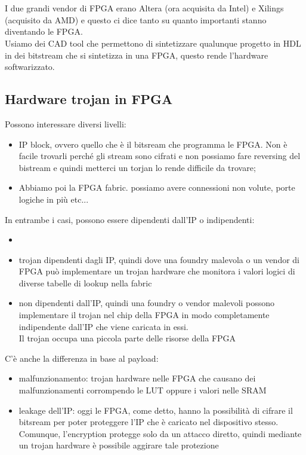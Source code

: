 \documentclass[oneside, 12pt]{extbook}
\begin{document}
\\\\I due grandi vendor di FPGA erano Altera (ora acquisita da Intel) e Xilings (acquisito da AMD) e questo ci dice tanto su quanto importanti stanno diventando le FPGA.
\\Usiamo dei CAD tool che permettono di sintetizzare qualunque progetto in HDL in dei bitstream che si sintetizza in una FPGA, questo rende l'hardware softwarizzato.

\subsection{Hardware trojan in FPGA}
Possono interessare diversi livelli:
\begin{itemize}
	\item IP block, ovvero quello che è il bitsream che programma le FPGA. Non è facile trovarli perché gli stream sono cifrati e non possiamo fare reversing del bistream e quindi metterci un torjan lo rende difficile da trovare;
	\item Abbiamo poi la FPGA fabric. possiamo avere connessioni non volute, porte logiche in più etc...
\end{itemize}
In entrambe i casi, possono essere dipendenti dall'IP o indipendenti:
\begin{itemize}
	\item \item trojan dipendenti dagli IP, quindi dove una foundry malevola o un vendor di FPGA può implementare un trojan hardware che monitora i valori logici di diverse tabelle di lookup nella fabric
	\item non dipendenti dall'IP, quindi una foundry o vendor malevoli possono implementare il trojan nel chip della FPGA in modo completamente indipendente dall'IP che viene caricata in essi.
	\\Il trojan occupa una piccola parte delle risorse della FPGA
\end{itemize}
C'è anche la differenza in base al payload:
\begin{itemize}
	\item malfunzionamento: trojan hardware nelle FPGA che causano dei malfunzionamenti corrompendo le LUT oppure i valori nelle SRAM
	\item leakage dell'IP: oggi le FPGA, come detto, hanno la possibilità di cifrare il bitsream per poter proteggere l'IP che è caricato nel dispositivo stesso.
	\\Comunque, l'encryption protegge solo da un attacco diretto, quindi mediante un trojan hardware è possibile aggirare tale protezione
\end{itemize}
\end{document}
